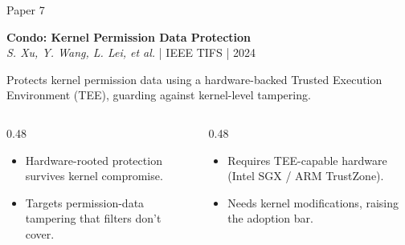 \documentclass[aspectratio=169,11pt]{beamer}
\begin{document}
\begin{frame}{Paper 7}
\vspace{0.4cm}
\begin{center}
{\Large\bfseries Condo: Kernel Permission Data Protection}\\[0.15cm]
{\small\color{DarkGray}\textit{S. Xu, Y. Wang, L. Lei, et al.} | IEEE TIFS | 2024}
\end{center}

\vspace{0.2cm}
{\small Protects kernel permission data using a hardware-backed Trusted Execution Environment (TEE), guarding against kernel-level tampering.}

\vspace{0.2cm}
\begin{columns}[T,onlytextwidth]
\begin{column}{0.48\textwidth}
\begin{tcolorbox}[colback=green!5,colframe=green!50!black,title={\textcolor{green!50!black}{\faCheckCircle}~Where It Wins},fonttitle=\bfseries\small,boxrule=0.5pt,arc=2mm,left=2mm,right=2mm,top=1mm,bottom=1mm]
\footnotesize
\begin{itemize}
  \item Hardware-rooted protection survives kernel compromise.
  \item Targets permission-data tampering that filters don't cover.
\end{itemize}
\end{tcolorbox}
\end{column}

\begin{column}{0.48\textwidth}
\begin{tcolorbox}[colback=red!5,colframe=red!50!black,title={\textcolor{red}{\faTimesCircle}~Where It Struggles},fonttitle=\bfseries\small,boxrule=0.5pt,arc=2mm,left=2mm,right=2mm,top=1mm,bottom=1mm]
\footnotesize
\begin{itemize}
  \item Requires TEE-capable hardware (Intel SGX / ARM TrustZone).
  \item Needs kernel modifications, raising the adoption bar.
\end{itemize}
\end{tcolorbox}
\end{column}
\end{columns}
\end{frame}
\end{document}
